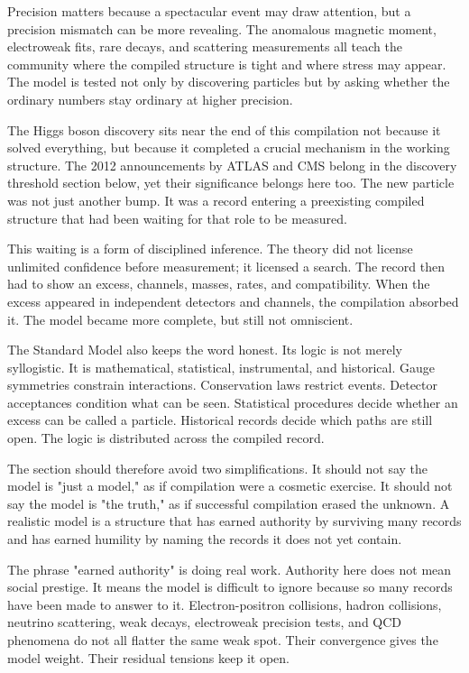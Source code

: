 Precision matters because a spectacular event may draw attention, but a
precision mismatch can be more revealing. The anomalous magnetic moment,
electroweak fits, rare decays, and scattering measurements all teach the
community where the compiled structure is tight and where stress may appear.
The model is tested not only by discovering particles but by asking whether
the ordinary numbers stay ordinary at higher precision.

The Higgs boson discovery sits near the end of this compilation not because it
solved everything, but because it completed a crucial mechanism in the working
structure. The 2012 announcements by ATLAS and CMS belong in the discovery
threshold section below, yet their significance belongs here too. The new
particle was not just another bump. It was a record entering a preexisting
compiled structure that had been waiting for that role to be measured.

This waiting is a form of disciplined inference. The theory did not license
unlimited confidence before measurement; it licensed a search. The record
then had to show an excess, channels, masses, rates, and compatibility. When
the excess appeared in independent detectors and channels, the compilation
absorbed it. The model became more complete, but still not omniscient.

The Standard Model also keeps the word  honest. Its logic is
not merely syllogistic. It is mathematical, statistical, instrumental, and
historical. Gauge symmetries constrain interactions. Conservation laws
restrict events. Detector acceptances condition what can be seen. Statistical
procedures decide whether an excess can be called a particle. Historical
records decide which paths are still open. The logic is distributed across
the compiled record.

The section should therefore avoid two simplifications. It should not say the
model is "just a model," as if compilation were a cosmetic exercise. It should
not say the model is "the truth," as if successful compilation erased the
unknown. A realistic model is a structure that has earned authority by
surviving many records and has earned humility by naming the records it does
not yet contain.

The phrase "earned authority" is doing real work. Authority here does not mean
social prestige. It means the model is difficult to ignore because so many
records have been made to answer to it. Electron-positron collisions, hadron
collisions, neutrino scattering, weak decays, electroweak precision tests,
and QCD phenomena do not all flatter the same weak spot. Their convergence
gives the model weight. Their residual tensions keep it open.

